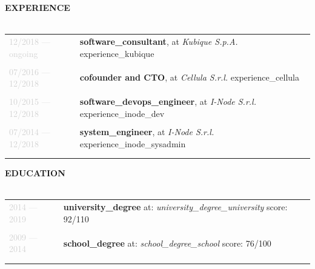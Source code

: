 \documentclass{article}
\begin{document}
\textbf{\textcolor{deepblue}{\uppercase{{{experience}}}}} \\\\ \hfill
\begin{tabular}{ R{3cm} L{12cm} }
	\textcolor{lightgray}{12/2018 — {{ongoing}}} &
		\textbf{{{software_consultant}}}, \MakeLowercase{{{at}}} \textit{Kubique S.p.A.} \linebreak
		{{experience_kubique}} \\\\ \hfill
	\textcolor{lightgray}{07/2016 — 12/2018} &
		\textbf{{{cofounder}} {{and}} CTO}, \MakeLowercase{{{at}}} \textit{Cellula S.r.l.} \linebreak
		{{experience_cellula}} \\\\ \hfill
	\textcolor{lightgray}{10/2015 — 12/2018} &
		\textbf{{{software_devops_engineer}}}, \MakeLowercase{{{at}}} \textit{I-Node S.r.l.} \linebreak
		{{experience_inode_dev}} \\\\ \hfill
	\textcolor{lightgray}{07/2014 — 12/2018} &
		\textbf{{{system_engineer}}}, \MakeLowercase{{{at}}} \textit{I-Node S.r.l.} \linebreak
		{{experience_inode_sysadmin}} \\\\ \hfill
\end{tabular}

\textbf{\textcolor{deepblue}{\uppercase{{{education}}}}} \\\\ \hfill
\begin{tabular}{ R{3cm} L{12cm} }
	\textcolor{lightgray}{2014 — 2019} &
		\textbf{{{university_degree}}} \linebreak
		{{at}}: \textit{{{university_degree_university}}} \linebreak
		{{score}}: 92/110 \\\\ \hfill
	\textcolor{lightgray}{2009 — 2014} &
		\textbf{{{school_degree}}} \linebreak
		{{at}}: \textit{{{school_degree_school}}} \linebreak
		{{score}}: 76/100 \\\\ \hfill
\end{tabular}

\newpage
\end{document}

